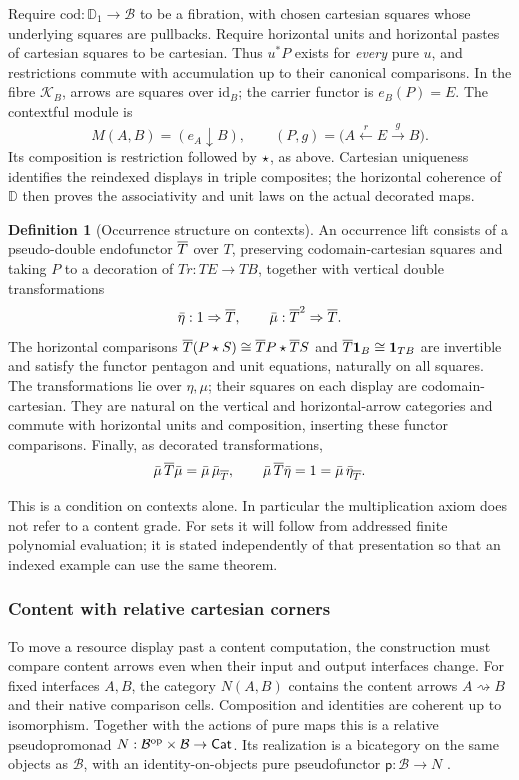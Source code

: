 \documentclass[11pt]{article}
\numberwithin{equation}{section}
\theoremstyle{definition}\newtheorem{definition}[theorem]{Definition}
\newcommand{\B}{\mathcal B}\newcommand{\J}{\mathcal J}
\newcommand{\D}{\mathbb D}\newcommand{\N}{\mathbb N}
\newcommand{\K}{\mathcal K}\newcommand{\Lcat}{\mathcal L}
\newcommand{\id}{\mathrm{id}}\newcommand{\op}{\mathrm{op}}\newcommand{\dom}{\mathrm{dom}}\newcommand{\cod}{\mathrm{cod}}
\newcommand{\pure}{\mathsf p}\newcommand{\grade}{\mathsf G}
\begin{document}
Require $\cod:\D_1\to\B$ to be a fibration, with chosen cartesian
squares whose underlying squares are pullbacks. Require horizontal units
and horizontal pastes of cartesian squares to be cartesian. Thus $u^*P$
exists for \emph{every} pure $u$, and restrictions commute with accumulation
up to their canonical comparisons. In the fibre $\K_B$, arrows are
squares over $\id_B$; the carrier functor is $e_B(P)=E$. The contextful
module is
\[
 M(A,B)=(e_A\downarrow B),\qquad
 (P,g)=\bigl(A\xleftarrow{r}E\xrightarrow{g}B\bigr).
\]
Its composition is restriction followed by $\mathbin{\star}$, as above. Cartesian
uniqueness identifies the reindexed displays in triple composites; the
horizontal coherence of $\D$ then proves the associativity and unit laws
on the actual decorated maps.

\begin{definition}[Occurrence structure on contexts]\label{def:lift}
An occurrence lift consists of a pseudo-double endofunctor $\overline T$ over
$T$, preserving codomain-cartesian squares and taking $P$ to a decoration
of $Tr:TE\to TB$, together with vertical double transformations
\[
 \bar\eta:1\Rightarrow\overline T,\qquad
 \bar\mu:\overline T^2\Rightarrow\overline T.
\]
The horizontal comparisons
$\overline T(P\mathbin{\star} S)\cong\overline T P\mathbin{\star}\overline T S$ and
$\overline T\mathbf1_B\cong\mathbf1_{TB}$ are invertible and satisfy the functor
pentagon and unit equations, naturally on all squares. The transformations
lie over $\eta,\mu$; their squares on each display are codomain-cartesian.
They are natural on the vertical and horizontal-arrow categories and
commute with horizontal units and composition, inserting these functor
comparisons. Finally, as decorated transformations,
\[
 \bar\mu\,\overline T\bar\mu=\bar\mu\,\bar\mu_{\overline T},\qquad
 \bar\mu\,\overline T\bar\eta=1=\bar\mu\,\bar\eta_{\overline T}.
\]
\end{definition}
This is a condition on contexts alone. In particular the multiplication
axiom does not refer to a content grade. For sets it will follow from
addressed finite polynomial evaluation; it is stated independently of
that presentation so that an indexed example can use the same theorem.

\subsubsection{Content with relative cartesian corners}\label{sec:coninput}
To move a resource display past a content computation, the construction must compare
content arrows even when their input and output interfaces change.
For fixed interfaces \(A,B\), the category \(N(A,B)\) contains
the content arrows \(A\rightsquigarrow B\) and their native comparison
cells. Composition and identities are coherent up to isomorphism.
Together with the actions of pure maps this is a relative
pseudopromonad \(N:\B^{\op}\times\B\to\Cat\). Its realization is a
bicategory on the same objects as \(\B\), with an identity-on-objects
pure pseudofunctor \(\pure:\B\to N\) \cite[Secs.~2--3]{U}.
\end{document}
